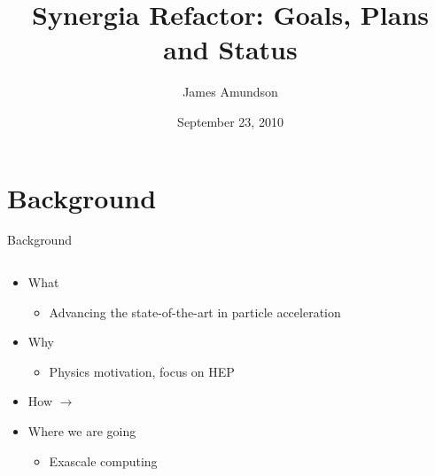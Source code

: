 \documentclass{beamer}
\title[Synergia Refactor]{Synergia Refactor: Goals, Plans and Status}
\author{James Amundson}
\institute[Fermilab]{Fermilab}
\date{September 23, 2010}
\begin{document}
\begin{frame}
  \titlepage
\end{frame}



\section{Background}

\begin{frame}{Background}
\begin{columns}
  \begin{column}{0.5\textwidth}
    \begin{itemize}
      \item What
      \begin{itemize}
	\item Advancing the state-of-the-art in particle acceleration
      \end{itemize}
      \item Why
      \begin{itemize}
	\item Physics motivation, focus on HEP
      \end{itemize}
      \item How {\Huge $\rightarrow$}
      \item Where we are going
      \begin{itemize}
	\item Exascale computing
      \end{itemize}
    \end{itemize}

  \end{column}
  \begin{column}{0.5\textwidth}
  \end{column}
\end{columns}


\end{frame}
\end{document}
